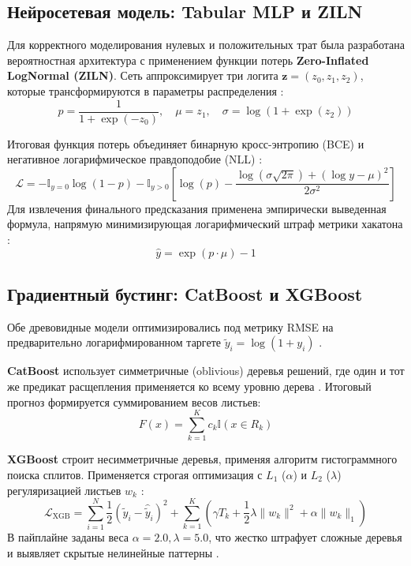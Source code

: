 \documentclass[12pt, a4paper]{article}
\begin{document}
	\subsection{Нейросетевая модель: Tabular MLP и ZILN}
	Для корректного моделирования нулевых и положительных трат была разработана вероятностная архитектура с применением функции потерь \textbf{Zero-Inflated LogNormal (ZILN)}. Сеть аппроксимирует три логита $\mathbf{z} = (z_0, z_1, z_2)$, которые трансформируются в параметры распределения \cite{ref:train}: 
	$$ p = \frac{1}{1 + \exp(-z_0)}, \quad \mu = z_1, \quad \sigma = \log(1 + \exp(z_2)) $$
	
	Итоговая функция потерь объединяет бинарную кросс-энтропию (BCE) и негативное логарифмическое правдоподобие (NLL) \cite{ref:google_ltv, ref:train}: 
	$$
	\mathcal{L} = - \mathbb{I}_{y=0} \log(1-p) - \mathbb{I}_{y>0} \left[ \log(p) - \frac{\log(\sigma \sqrt{2\pi}) + (\log y - \mu)^2}{2\sigma^2} \right]
	$$
	Для извлечения финального предсказания применена эмпирически выведенная формула, напрямую минимизирующая логарифмический штраф метрики хакатона \cite{ref:train}:
	$$ \hat{y} = \exp(p \cdot \mu) - 1 $$
	
	\subsection{Градиентный бустинг: CatBoost и XGBoost}
	Обе древовидные модели оптимизировались под метрику RMSE на предварительно логарифмированном таргете $\tilde{y}_i = \log(1 + y_i)$ \cite{ref:train}.
	
	\textbf{CatBoost} использует симметричные (oblivious) деревья решений, где один и тот же предикат расщепления применяется ко всему уровню дерева \cite{ref:catboost}. Итоговый прогноз формируется суммированием весов листьев:
	$$ F(x) = \sum_{k=1}^K c_k \mathbb{I}(x \in R_k) $$
	
	\textbf{XGBoost} строит несимметричные деревья, применяя алгоритм гистограммного поиска сплитов. Применяется строгая оптимизация с $L_1$ ($\alpha$) и $L_2$ ($\lambda$) регуляризацией листьев $w_k$ \cite{ref:xgboost, ref:train}: 
	$$ \mathcal{L}_{\text{XGB}} = \sum_{i=1}^N \frac{1}{2} (\tilde{y}_i - \hat{\tilde{y}}_i)^2 + \sum_{k=1}^K \left( \gamma T_k + \frac{1}{2}\lambda \|w_k\|^2 + \alpha \|w_k\|_1 \right) $$
	В пайплайне заданы веса $\alpha = 2.0, \lambda = 5.0$, что жестко штрафует сложные деревья и выявляет скрытые нелинейные паттерны \cite{ref:train}.
	
\end{document}

